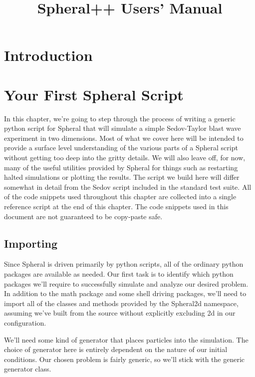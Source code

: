 \documentclass[11pt]{memoir}
\title{Spheral++ Users' Manual}
\begin{document}
\maketitle

\chapter{Introduction}

\chapter{Your First Spheral Script}

\lstset{basicstyle=\small,style=myCustomPythonStyle}

In this chapter, we're going to step through the process of writing a generic python script for Spheral that will simulate a simple Sedov-Taylor blast wave experiment in two dimensions. Most of what we cover here will be intended to provide a surface level understanding of the various parts of a Spheral script without getting too deep into the gritty details. We will also leave off, for now, many of the useful utilities provided by Spheral for things such as restarting halted simulations or plotting the results. The script we build here will differ somewhat in detail from the Sedov script included in the standard test suite. All of the code snippets used throughout this chapter are collected into a single reference script at the end of this chapter. The code snippets used in this document are not guaranteed to be copy-paste safe.

\section{Importing}

Since Spheral is driven primarily by python scripts, all of the ordinary python packages are available as needed. Our first task is to identify which python packages we'll require to successfully simulate and analyze our desired problem. In addition to the math package and some shell driving packages, we'll need to import all of the classes and methods provided by the Spheral2d namespace, assuming we've built from the source without explicitly excluding 2d in our configuration.



We'll need some kind of generator that places particles into the simulation. The choice of generator here is entirely dependent on the nature of our initial conditions. Our chosen problem is fairly generic, so we'll stick with the generic generator class.
\end{document}
